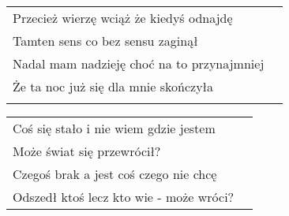 \documentclass[a5paper]{article}
\begin{document}
\noindent
\begin{tabular}{@{}p{7.50cm}p{3cm}@{}}
Przecież wierzę wciąż że kiedyś odnajdę \\
Tamten sens co bez sensu zaginął \\
Nadal mam nadzieję choć na to przynajmniej \\
Że ta noc już się dla mnie skończyła \\ \\
\end{tabular}

\noindent
\begin{tabular}{@{}p{8.50cm}p{3cm}@{}}
Coś się stało i nie wiem gdzie jestem \\
Może świat się przewrócił? \\
Czegoś brak a jest coś czego nie chcę \\
Odszedł ktoś lecz kto wie - może wróci?
\end{tabular}
\end{document}
